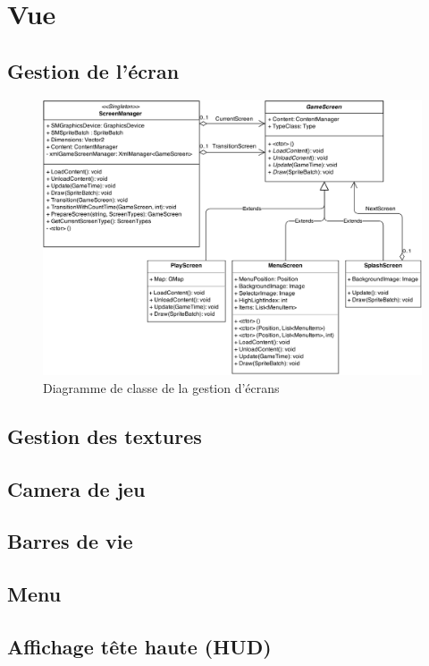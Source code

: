 \documentclass[11pt, a4paper, oneside]{report}
\begin{document}
\section{Vue}
\subsection{Gestion de l'écran}
\begin{figure}[H]
	\begin{center}
	\includegraphics[width=1\textwidth]{screenmanagement}
	\caption{Diagramme de classe de la gestion d'écrans}
	\label{fig:screenmanagement}
	\end{center}
\end{figure}
\subsection{Gestion des textures}
\label{subsec:texturemanager}
\subsection{Camera de jeu}
\subsection{Barres de vie}
\subsection{Menu}
\subsection{Affichage tête haute (HUD)}
\newpage
\end{document}
